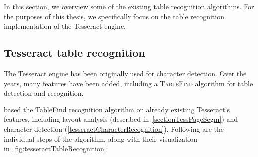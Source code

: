 In this section, we overview some of the existing table recognition algorithms. For the purposes of this thesis, we specifically focus on the table recognition implementation of the Tesseract engine.

\subsection{Tesseract table recognition} \label{tableFind}

The Tesseract engine has been originally used for character detection. Over the years, many features have been added, including a \textsc{TableFind} algorithm for table detection and recognition.

\citet{tableDetHeterogeneous} based the TableFind recognition algorithm on already existing Tesseract's features, including layout analysis (described in~\cref{sectionTessPageSegm}) and character detection (\cref{tesseractCharacterRecognition}). Following are the individual steps of the algorithm, along with their visualization in~\cref{fig:tesseractTableRecognition}: 

